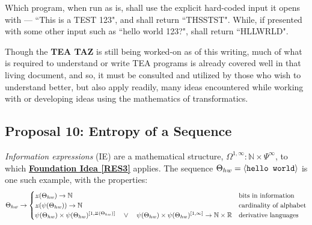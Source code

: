 \documentclass[12pt,a4paper]{article}
\newcommand{\invpi}[1]{\mathop{\rotatebox[origin=c]{180}{$\pi$}}#1}
\begin{document}
 Which program, when run as is, shall use the explicit hard-coded input it opens with --- ``This is a TEST 123", and shall return ``THSSTST". While, if presented with some other input such as ``hello world 123?", shall return ``HLLWRLD".
 
 Though the \textbf{TEA TAZ}\cite{Lutalo2024TEATAZ} is still being worked-on as of this writing, much of what is required to understand or write TEA programs is already covered well in that living document, and so, it must be consulted and utilized by those who wish to understand better, but also apply readily, many ideas encountered while working with or developing ideas using the mathematics of transformatics.


\subsection{Proposal 10: Entropy of a Sequence\cite{lnspaper}}
\label{PROPTOE}

\textit{Information expressions} (IE)\cite{lnspaper} are a mathematical structure, $\Omega^{1,\infty} : \mathbb{N} \times \Psi^\infty$, to which \textbf{\hyperref[RES3]{Foundation Idea \ref{RES3}}} applies. The sequence $\Theta_{hw} = \langle \text{\texttt{hello world}} \rangle$ is one such example, with the properties:\\

\begin{equation}
\label{EQPROP10}
\Theta_{hw} \rightarrow \begin{cases}
\invpi(\Theta_{hw}) \rightarrow \mathbb{N} & \text{bits in information}\\
\invpi(\psi(\Theta_{hw})) \rightarrow \mathbb{N} & \text{cardinality of alphabet}\\
\psi(\Theta_{hw}) \times \psi(\Theta_{hw})^{[1,\invpi(\Theta_{hw})]} \quad \lor \quad \psi(\Theta_{hw}) \times \psi(\Theta_{hw})^{[1,\infty]} \rightarrow \mathbb{N} \times \mathbb{R} & \text{derivative languages}\\
\end{cases}
\end{equation}
\end{document}
